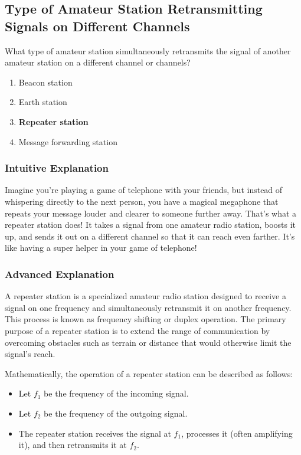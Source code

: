 \subsection{Type of Amateur Station Retransmitting Signals on Different Channels}
\label{T1F09}

\begin{tcolorbox}[colback=gray!10!white,colframe=black!75!black,title=T1F09]
What type of amateur station simultaneously retransmits the signal of another amateur station on a different channel or channels?
\begin{enumerate}[label=\Alph*]
    \item Beacon station
    \item Earth station
    \item \textbf{Repeater station}
    \item Message forwarding station
\end{enumerate}
\end{tcolorbox}

\subsubsection{Intuitive Explanation}
Imagine you’re playing a game of telephone with your friends, but instead of whispering directly to the next person, you have a magical megaphone that repeats your message louder and clearer to someone further away. That’s what a repeater station does! It takes a signal from one amateur radio station, boosts it up, and sends it out on a different channel so that it can reach even farther. It’s like having a super helper in your game of telephone!

\subsubsection{Advanced Explanation}
A repeater station is a specialized amateur radio station designed to receive a signal on one frequency and simultaneously retransmit it on another frequency. This process is known as frequency shifting or duplex operation. The primary purpose of a repeater station is to extend the range of communication by overcoming obstacles such as terrain or distance that would otherwise limit the signal's reach.

Mathematically, the operation of a repeater station can be described as follows:
\begin{itemize}
    \item Let \( f_1 \) be the frequency of the incoming signal.
    \item Let \( f_2 \) be the frequency of the outgoing signal.
    \item The repeater station receives the signal at \( f_1 \), processes it (often amplifying it), and then retransmits it at \( f_2 \).
\end{itemize}

